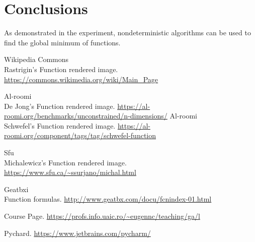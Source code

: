 \documentclass{article}
\begin{document}
\section{Conclusions}
As demonstrated in the experiment, nondeterministic algorithms can be used to find the global minimum of functions.


\begin{thebibliography}{9}

  Wikipedia Commons \\ Rastrigin's Function rendered image.
  \url{https://commons.wikimedia.org/wiki/Main_Page}

  Al-roomi  \\ De Jong's Function rendered image.
  \url{https://al-roomi.org/benchmarks/unconstrained/n-dimensions/}
  Al-roomi  \\ Schwefel's Function rendered image.
  \url{https://al-roomi.org/component/tags/tag/schwefel-function}

   Sfu \\ Michalewicz's Function rendered image.  
\url{https://www.sfu.ca/~ssurjano/michal.html}


  Geatbxi  \\ Function formulas.
  \url{http://www.geatbx.com/docu/fcnindex-01.html}

  Course Page.
  \url{https://profs.info.uaic.ro/~eugennc/teaching/ga/l}

  Pychard.
  \url{https://www.jetbrains.com/pycharm/}


\end{thebibliography}  
\end{document}
